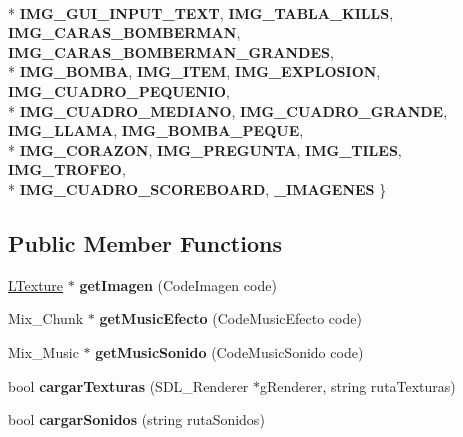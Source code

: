 \begin{DoxyCompactItemize}
\\*
{\bfseries I\+M\+G\+\_\+\+G\+U\+I\+\_\+\+I\+N\+P\+U\+T\+\_\+\+T\+E\+XT}, 
{\bfseries I\+M\+G\+\_\+\+T\+A\+B\+L\+A\+\_\+\+K\+I\+L\+LS}, 
{\bfseries I\+M\+G\+\_\+\+C\+A\+R\+A\+S\+\_\+\+B\+O\+M\+B\+E\+R\+M\+AN}, 
{\bfseries I\+M\+G\+\_\+\+C\+A\+R\+A\+S\+\_\+\+B\+O\+M\+B\+E\+R\+M\+A\+N\+\_\+\+G\+R\+A\+N\+D\+ES}, 
\\*
{\bfseries I\+M\+G\+\_\+\+B\+O\+M\+BA}, 
{\bfseries I\+M\+G\+\_\+\+I\+T\+EM}, 
{\bfseries I\+M\+G\+\_\+\+E\+X\+P\+L\+O\+S\+I\+ON}, 
{\bfseries I\+M\+G\+\_\+\+C\+U\+A\+D\+R\+O\+\_\+\+P\+E\+Q\+U\+E\+N\+IO}, 
\\*
{\bfseries I\+M\+G\+\_\+\+C\+U\+A\+D\+R\+O\+\_\+\+M\+E\+D\+I\+A\+NO}, 
{\bfseries I\+M\+G\+\_\+\+C\+U\+A\+D\+R\+O\+\_\+\+G\+R\+A\+N\+DE}, 
{\bfseries I\+M\+G\+\_\+\+L\+L\+A\+MA}, 
{\bfseries I\+M\+G\+\_\+\+B\+O\+M\+B\+A\+\_\+\+P\+E\+Q\+UE}, 
\\*
{\bfseries I\+M\+G\+\_\+\+C\+O\+R\+A\+Z\+ON}, 
{\bfseries I\+M\+G\+\_\+\+P\+R\+E\+G\+U\+N\+TA}, 
{\bfseries I\+M\+G\+\_\+\+T\+I\+L\+ES}, 
{\bfseries I\+M\+G\+\_\+\+T\+R\+O\+F\+EO}, 
\\*
{\bfseries I\+M\+G\+\_\+\+C\+U\+A\+D\+R\+O\+\_\+\+S\+C\+O\+R\+E\+B\+O\+A\+RD}, 
{\bfseries \+\_\+\+I\+M\+A\+G\+E\+N\+ES}
 \}\hypertarget{class_galeria_a4d8d723f9fa027d3ed8dec680d8a57a9}{}\label{class_galeria_a4d8d723f9fa027d3ed8dec680d8a57a9}

\end{DoxyCompactItemize}
\subsection*{Public Member Functions}
\begin{DoxyCompactItemize}
\item 
\hyperlink{class_l_texture}{L\+Texture} $\ast$ {\bfseries get\+Imagen} (Code\+Imagen code)\hypertarget{class_galeria_a2effd1fed7eb30b0258ddca113891af8}{}\label{class_galeria_a2effd1fed7eb30b0258ddca113891af8}

\item 
Mix\+\_\+\+Chunk $\ast$ {\bfseries get\+Music\+Efecto} (Code\+Music\+Efecto code)\hypertarget{class_galeria_a008113f3eae096c2a02154ddaae5152b}{}\label{class_galeria_a008113f3eae096c2a02154ddaae5152b}

\item 
Mix\+\_\+\+Music $\ast$ {\bfseries get\+Music\+Sonido} (Code\+Music\+Sonido code)\hypertarget{class_galeria_aad0b599a285380784600e34eaabb01ed}{}\label{class_galeria_aad0b599a285380784600e34eaabb01ed}

\item 
bool {\bfseries cargar\+Texturas} (S\+D\+L\+\_\+\+Renderer $\ast$g\+Renderer, string ruta\+Texturas)\hypertarget{class_galeria_ac2dafe4ff2618f306b19f929a34fbe66}{}\label{class_galeria_ac2dafe4ff2618f306b19f929a34fbe66}

\item 
bool {\bfseries cargar\+Sonidos} (string ruta\+Sonidos)\hypertarget{class_galeria_a2921ac0b56f2b895f1ab7f4293487942}{}\label{class_galeria_a2921ac0b56f2b895f1ab7f4293487942}

\end{DoxyCompactItemize}


